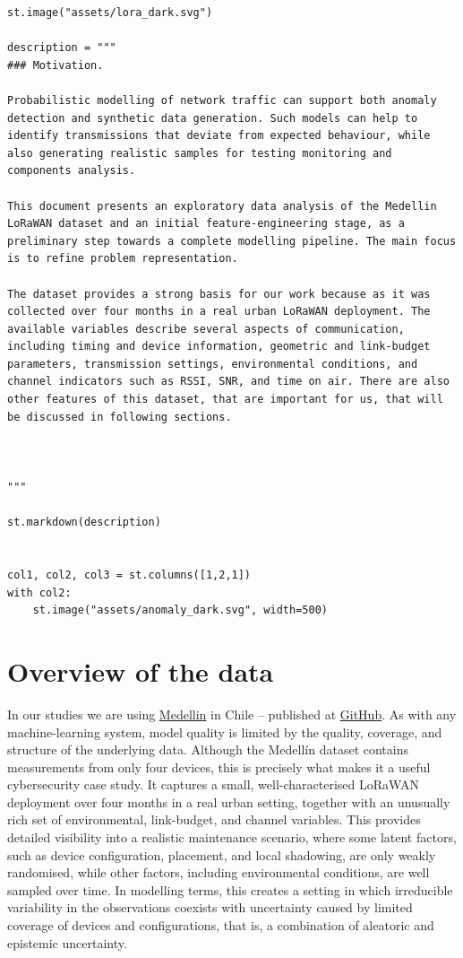 \documentclass[11pt]{article}
\begin{document}
\begin{verbatim}
st.image("assets/lora_dark.svg")

description = """
### Motivation.

Probabilistic modelling of network traffic can support both anomaly detection and synthetic data generation. Such models can help to identify transmissions that deviate from expected behaviour, while also generating realistic samples for testing monitoring and  components analysis.

This document presents an exploratory data analysis of the Medellin LoRaWAN dataset and an initial feature-engineering stage, as a preliminary step towards a complete modelling pipeline. The main focus is to refine problem representation.

The dataset provides a strong basis for our work because as it was collected over four months in a real urban LoRaWAN deployment. The available variables describe several aspects of communication, including timing and device information, geometric and link-budget parameters, transmission settings, environmental conditions, and channel indicators such as RSSI, SNR, and time on air. There are also other features of this dataset, that are important for us, that will be discussed in following sections.



"""

st.markdown(description)


col1, col2, col3 = st.columns([1,2,1])
with col2:
    st.image("assets/anomaly_dark.svg", width=500)

\end{verbatim}
\section{Overview of the data}
\label{sec:org65dbfeb}
In our studies we are using \href{https://www.mdpi.com/2306-5729/8/1/4}{Medellin} in Chile -- published at \href{https://github.com/magonzalezudem/MDPI\_LoRaWAN\_Dataset\_With\_Environmental\_Variables}{GitHub}. As with any machine-learning system, model quality is limited by the quality, coverage, and structure of the underlying data. Although the Medellín dataset contains measurements from only four devices, this is precisely what makes it a useful cybersecurity case study. It captures a small, well-characterised LoRaWAN deployment over four months in a real urban setting, together with an unusually rich set of environmental, link-budget, and channel variables. This provides detailed visibility into a realistic maintenance scenario, where some latent factors, such as device configuration, placement, and local shadowing, are only weakly randomised, while other factors, including environmental conditions, are well sampled over time. In modelling terms, this creates a setting in which irreducible variability in the observations coexists with uncertainty caused by limited coverage of devices and configurations, that is, a combination of aleatoric and epistemic uncertainty.
\end{document}
